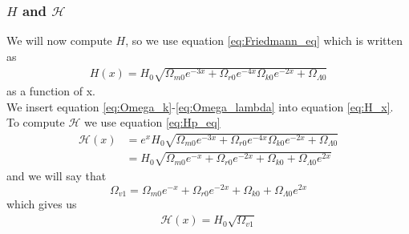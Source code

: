 \documentclass{aa}
\begin{document}
\subsubsection{$H$ and $\mathcal{H}$}
We will now compute $H$, so we use equation \eqref{eq:Friedmann_eq} which is written as 
\begin{align}
     H(x)=H_0\sqrt{\Omega_{m0}e^{-3x}+\Omega_{r0}e^{-4x}\Omega_{k0}e^{-2x}+\Omega_{\Lambda0}} \label{eq:H_x}
\end{align}
as a function of x.\\
We insert equation \eqref{eq:Omega_k}-\eqref{eq:Omega_lambda} into equation \eqref{eq:H_x}.\\
To compute $\mathcal{H}$ we use equation \eqref{eq:Hp_eq}  
\begin{align}
    \mathcal{H}(x)&=e^xH_0\sqrt{{\Omega_{m0}e^{-3x}+\Omega_{r0}e^{-4x}\Omega_{k0}e^{-2x}+\Omega_{\Lambda0}}}\\
    &=H_0\sqrt{\Omega_{m0}e^{-x}+\Omega_{r0}e^{-2x}+\Omega_{k0}+\Omega_{\Lambda0}e^{2x}}\label{eq:Hp_eq}
\end{align}
and we will say that $$\Omega_{v1}=\Omega_{m0}e^{-x}+\Omega_{r0}e^{-2x}+\Omega_{k0}+\Omega_{\Lambda0}e^{2x}$$ which gives us \begin{align}
     \mathcal{H}(x)=H_0\sqrt{\Omega_{v1}} \label{eq:Hp_x_omega}
\end{align}  
\end{document}
